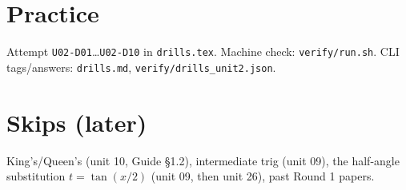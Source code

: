 \section{Practice}
Attempt \texttt{U02-D01}\ldots\texttt{U02-D10} in \texttt{drills.tex}.
Machine check: \texttt{verify/run.sh}. CLI tags/answers: \texttt{drills.md}, \texttt{verify/drills\_unit2.json}.

\section{Skips (later)}
King's/Queen's (unit 10, Guide \S1.2), intermediate trig (unit 09), the half-angle substitution $t=\tan(x/2)$ (unit 09, then unit 26), past Round 1 papers.

